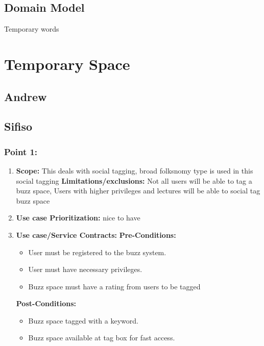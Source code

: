 \documentclass[11pt]{article}
\begin{document}
\subsection{Domain Model}
Temporary words

\newpage
\section{Temporary Space}

\subsection{Andrew}



\newpage

\subsection{Sifiso}
\subsubsection{Point 1:} 
\begin{enumerate}
\item 
\textbf{Scope:}
This deals with social tagging, broad folksnomy type is used in this social tagging
\newline
\textbf{Limitations/exclusions:} 
Not all users will be able to tag a buzz space, Users with higher privileges and lectures will be able to social tag buzz space

\item 
\textbf{Use case Prioritization:} nice to have

\item 
\textbf{Use case/Service Contracts:} 
\newline
\textbf{Pre-Conditions: }
\begin{itemize}
\item User must be registered to the buzz system.
\item User must have necessary privileges.
\item Buzz space must have a rating from users to be tagged
\end{itemize}
 

\textbf{Post-Conditions: }
\begin{itemize}
\item Buzz space tagged with a keyword.
\item Buzz space available at tag box for fast access.
\end{itemize}
\end{enumerate}
\end{document}

